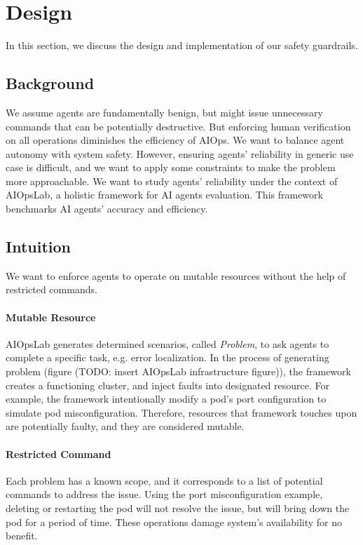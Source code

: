 \section{Design}

In this section, we discuss the design and implementation of our safety guardrails.

\subsection{Background}

We assume agents are fundamentally benign, but might issue unnecessary commands that can be potentially destructive. But enforcing human verification on all operations diminishes the efficiency of AIOps. We want to balance agent autonomy with system safety. However, ensuring agents' reliability in generic use case is difficult, and we want to apply some constraints to make the problem more approachable. We want to study agents' reliability under the context of AIOpsLab, a holistic framework for AI agents evaluation. This framework benchmarks AI agents' accuracy and efficiency.

\subsection{Intuition}

We want to enforce agents to operate on mutable resources without the help of restricted commands.

\paragraph{Mutable Resource} AIOpsLab generates determined scenarios, called \textit{Problem}, to ask agents to complete a specific task, e.g. error localization. In the process of generating problem (figure (TODO: insert AIOpsLab infrastructure figure)), the framework creates a functioning cluster, and inject faults into designated resource. For example, the framework intentionally modify a pod's port configuration to simulate pod misconfiguration. Therefore, resources that framework touches upon are potentially faulty, and they are considered mutable.

\paragraph{Restricted Command} Each problem has a known scope, and it corresponds to a list of potential commands to address the issue. Using the port misconfiguration example, deleting or restarting the pod will not resolve the issue, but will bring down the pod for a period of time. These operations damage system's availability for no benefit.

